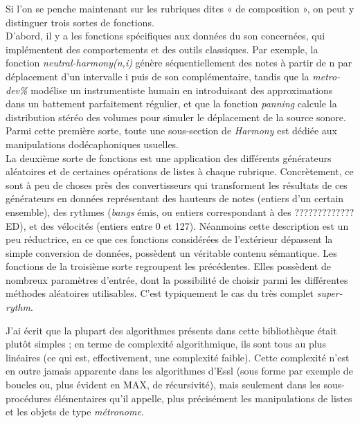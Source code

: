 \documentclass[a4paper,12pt]{article}
\begin{document}
Si l'on se penche maintenant sur les rubriques dites « de composition », on peut y distinguer trois sortes de fonctions. \\
D'abord, il y a les fonctions spécifiques aux données du son concernées, qui implémentent des comportements et des outils classiques. Par exemple, la fonction \emph{neutral-harmony(n,i)} génère séquentiellement des notes à partir de n par déplacement d'un intervalle i puis de son complémentaire, tandis que la \emph{metro-dev\%} modélise un instrumentiste humain en introduisant des approximations dans un battement parfaitement régulier, et que la fonction \emph{panning} calcule la distribution stéréo des volumes pour simuler le déplacement de la source sonore. Parmi cette première sorte, toute une sous-section de \emph{Harmony} est dédiée aux manipulations dodécaphoniques usuelles. \\
La deuxième sorte de fonctions est une application des différents générateurs aléatoires et de certaines opérations de listes à chaque rubrique. Concrètement, ce sont à peu de choses près des convertisseurs qui transforment les résultats de ces générateurs en données représentant des hauteurs de notes (entiers d'un certain ensemble), des rythmes (\emph{bangs} émis, ou entiers correspondant à des ?????????????ED), et des vélocités (entiers entre 0 et 127). Néanmoins cette description est un peu réductrice, en ce que ces fonctions considérées de l'extérieur dépassent la simple conversion de données, possèdent un véritable contenu sémantique.
Les fonctions de la troisième sorte regroupent les précédentes. Elles possèdent de nombreux paramètres d'entrée, dont la possibilité de choisir parmi les différentes méthodes aléatoires utilisables. C'est typiquement le cas du très complet \emph{super-rythm}.

J'ai écrit que la plupart des algorithmes présents dans cette bibliothèque était plutôt simples ; en terme de complexité algorithmique, ils sont tous au plus linéaires (ce qui est, effectivement, une complexité faible). Cette complexité n'est en outre jamais apparente dans les algorithmes d'Essl (sous forme par exemple de boucles ou, plus évident en MAX, de récursivité), mais seulement dans les sous-procédures élémentaires qu'il appelle, plus précisément les manipulations de listes et les objets de type \emph{métronome}. \\ 
\end{document}
